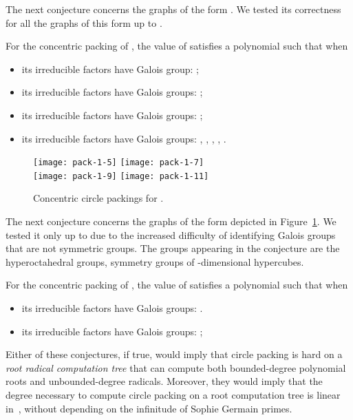 \documentclass[oribibl,10pt]{llncs}
\begin{document}
\begin{appendix}
The next conjecture concerns the graphs of the form . We tested its correctness for all the graphs of this form up to .
\begin{conjecture}
For the concentric packing of , the value of  satisfies a polynomial such that when
\begin{itemize}
\item  its irreducible factors have Galois group: ;
\item  its irreducible factors have Galois groups: ;
\item  its irreducible factors have Galois groups: ;
\item  its irreducible factors have Galois groups: , , , , .
\end{itemize}
\end{conjecture}

\begin{figure}[t]
\centering
\texttt{[image: pack-1-5]}\hspace{1em}
\texttt{[image: pack-1-7]}\\
\vspace{1em}
\texttt{[image: pack-1-9]}\hspace{1em}
\texttt{[image: pack-1-11]}
\caption{Concentric circle packings  for .}
\label{fig:pack1n}
\end{figure}

The next conjecture  concerns the graphs of the form  depicted in Figure~\ref{fig:pack1n}. We tested it only up to  due to the increased difficulty of identifying Galois groups that are not symmetric groups. The groups  appearing in the conjecture are the hyperoctahedral groups, symmetry groups of -dimensional hypercubes.

\begin{conjecture}
For the concentric packing of , the value of  satisfies a polynomial such that when
\begin{itemize}
\item  its irreducible factors have Galois groups: .
\item  its irreducible factors have Galois groups: ;
\end{itemize}
\end{conjecture}

Either of these conjectures, if true, would imply that circle packing is hard on a \emph{root radical computation tree} that can compute both bounded-degree polynomial roots and unbounded-degree radicals. Moreover, they would imply that the degree necessary to compute circle packing on a root computation tree is linear in~, without depending on the infinitude of Sophie Germain primes.

\newpage
{}

\end{appendix}
\end{document}
